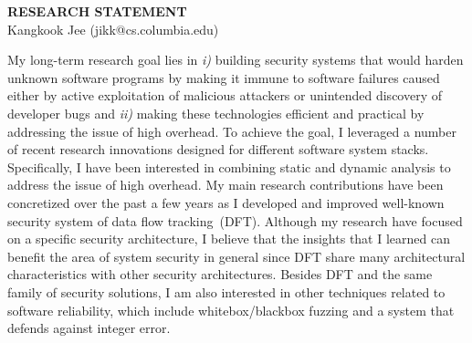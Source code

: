 \documentclass[letterpaper, 10pt]{article}
\begin{document}
\begin{small}

\begin{center}
{\LARGE \bf RESEARCH STATEMENT}\\
\vspace*{0.1cm}
{\normalsize Kangkook Jee (jikk@cs.columbia.edu)}
\end{center}



My long-term research goal lies in {\it i)} building security systems that
would harden unknown software programs by making it immune to software failures
caused either by active exploitation of malicious attackers or unintended
discovery of developer bugs and {\it ii)} making these technologies efficient
and practical by addressing the issue of high overhead.
%
To achieve the goal, I leveraged a number of recent research innovations
designed for different software system stacks. Specifically, I have been
interested in combining static and dynamic analysis to address the issue of
high overhead.
%
My main research contributions have been concretized over the past a few years
as I developed and improved well-known security system of data flow
tracking~(DFT). Although my research have focused on a specific security
architecture, I believe that the insights that I learned can benefit the area
of system security in general since DFT share many architectural
characteristics with other security architectures.
%
Besides DFT and the same family of security solutions, I am also interested in
other techniques related to software reliability, which include
whitebox/blackbox fuzzing and a system that defends against integer error.


\end{small}
\end{document}
